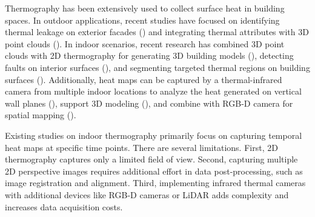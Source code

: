 Thermography has been extensively used to collect surface heat in building spaces. In outdoor applications, recent studies have focused on identifying thermal leakage on exterior facades (\cite{motayyeb2023fusion}) and integrating thermal attributes with 3D point clouds (\cite{jarzkabek2020supervised}). In indoor scenarios, recent research has combined 3D point clouds with 2D thermography for generating 3D building models (\cite{adan2017fusion,schmoll2022method}), detecting faults on interior surfaces (\cite{garrido2018autonomous}), and segmenting targeted thermal regions on building surfaces (\cite{adan2020temporal}). Additionally, heat maps can be captured by a thermal-infrared camera from multiple indoor locations to analyze the heat generated on vertical wall planes (\cite{lopez2017thermographic}), support 3D modeling (\cite{adan2017fusion}), and combine with RGB-D camera for spatial mapping (\cite{vidas20133d}).
 
Existing studies on indoor thermography primarily focus on capturing temporal heat maps at specific time points. There are several limitations. First, 2D thermography captures only a limited field of view. Second, capturing multiple 2D perspective images requires additional effort in data post-processing, such as image registration and alignment. Third, implementing infrared thermal cameras with additional devices like RGB-D cameras or LiDAR adds complexity and increases data acquisition costs.